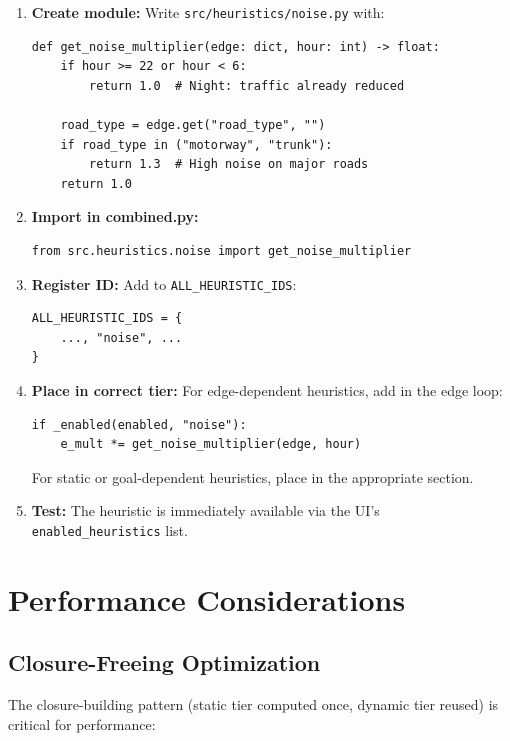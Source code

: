 \documentclass[12pt,a4paper]{article}
\begin{document}
\begin{enumerate}
  \item \textbf{Create module:} Write \texttt{src/heuristics/noise.py} with:
  \begin{lstlisting}
def get_noise_multiplier(edge: dict, hour: int) -> float:
    if hour >= 22 or hour < 6:
        return 1.0  # Night: traffic already reduced

    road_type = edge.get("road_type", "")
    if road_type in ("motorway", "trunk"):
        return 1.3  # High noise on major roads
    return 1.0
  \end{lstlisting}

  \item \textbf{Import in combined.py:}
  \begin{lstlisting}
from src.heuristics.noise import get_noise_multiplier
  \end{lstlisting}

  \item \textbf{Register ID:} Add to \texttt{ALL\_HEURISTIC\_IDS}:
  \begin{lstlisting}
ALL_HEURISTIC_IDS = {
    ..., "noise", ...
}
  \end{lstlisting}

  \item \textbf{Place in correct tier:} For edge-dependent heuristics, add in the edge loop:
  \begin{lstlisting}
if _enabled(enabled, "noise"):
    e_mult *= get_noise_multiplier(edge, hour)
  \end{lstlisting}
  For static or goal-dependent heuristics, place in the appropriate section.

  \item \textbf{Test:} The heuristic is immediately available via the UI's \texttt{enabled\_heuristics} list.
\end{enumerate}

\newpage

\section{Performance Considerations}

\subsection{Closure-Freeing Optimization}

The closure-building pattern (static tier computed once, dynamic tier reused) is critical for performance:
\end{document}
